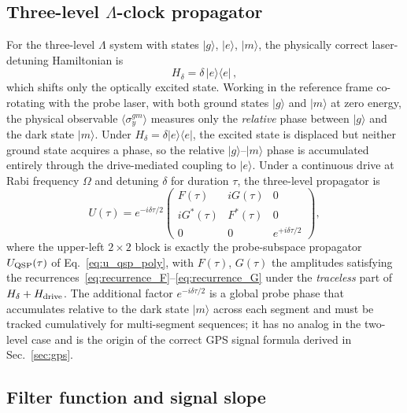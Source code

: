 \documentclass[aps,pra,twocolumn,superscriptaddress,longbibliography]{revtex4-2}
\newcommand{\be}{\begin{equation}}
\newcommand{\ee}{\end{equation}}
\begin{document}
\subsection{Three-level $\Lambda$-clock propagator}
\label{sec:3level_propagator}

For the three-level $\Lambda$ system with states $|g\rangle$, $|e\rangle$,
$|m\rangle$, the physically correct laser-detuning Hamiltonian is
\be
  H_\delta = \delta\,|e\rangle\langle e|\,,
  \label{eq:H_delta}
\ee
which shifts only the optically excited state.
Working in the reference frame co-rotating with the probe laser, with both ground states
$|g\rangle$ and $|m\rangle$ at zero energy, the physical observable
$\langle\sigma_y^{gm}\rangle$ measures only the \emph{relative} phase between
$|g\rangle$ and the dark state $|m\rangle$.
Under $H_\delta = \delta|e\rangle\langle e|$, the excited state is displaced but
neither ground state acquires a phase, so the relative $|g\rangle$--$|m\rangle$ phase
is accumulated entirely through the drive-mediated coupling to $|e\rangle$.
Under a continuous drive at Rabi frequency $\Omega$ and detuning $\delta$ for
duration $\tau$, the three-level propagator is
\be
  U(\tau) = e^{-i\delta\tau/2}
  \begin{pmatrix}
      F(\tau) & iG(\tau) & 0 \\
      iG^*(\tau) & F^*(\tau) & 0 \\
      0 & 0 & e^{+i\delta\tau/2}
  \end{pmatrix},
  \label{eq:propagator_3L}
\ee
where the upper-left $2\times 2$ block is exactly the probe-subspace propagator
$U_{\rm QSP}(\tau)$ of Eq.~\eqref{eq:u_qsp_poly}, with $F(\tau)$, $G(\tau)$
the amplitudes satisfying the recurrences~\eqref{eq:recurrence_F}--\eqref{eq:recurrence_G}
under the \emph{traceless} part of $H_\delta + H_{\rm drive}$.
The additional factor $e^{-i\delta\tau/2}$ is a global probe phase that
accumulates relative to the dark state $|m\rangle$ across each segment and
must be tracked cumulatively for multi-segment sequences; it has no analog
in the two-level case and is the origin of the correct GPS signal formula
derived in Sec.~\ref{sec:gps}.

\subsection{Filter function and signal slope}
\label{sec:three_level_kubo}
\end{document}
